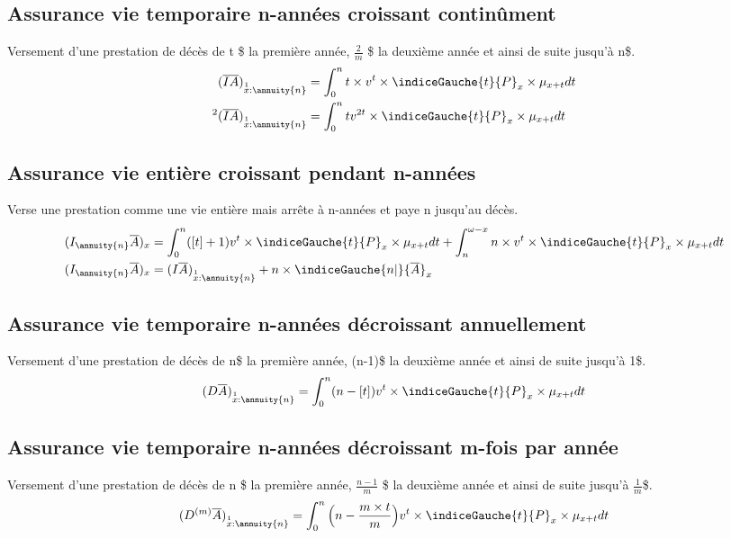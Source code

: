 \subsection{Assurance vie temporaire n-années croissant continûment}
Versement d'une prestation de décès de t \$ la première année, $\frac{2}{m}$ \$ la deuxième année et ainsi de suite jusqu'à n\$.
\begin{align*}
(\overline{IA})_{\overset{1}{x}:\annuity{n}} &= \int_{0}^{n} t\times v^t \times \indiceGauche{t}{P}_{x}\times \mu_{x+t}dt \\
{}^2(\overline{IA})_{\overset{1}{x}:\annuity{n}} &= \int_{0}^{n}t v^{2t} \times \indiceGauche{t}{P}_{x}\times \mu_{x+t}dt \\
\end{align*}

\subsection{Assurance vie  entière croissant pendant n-années}
Verse une prestation comme une vie entière mais arrête à n-années et paye n jusqu'au décès.
\begin{align*}
(I_{\annuity{n}}\overline{A})_{x} &= \int_{0}^{n}([t] +1 )v^t \times \indiceGauche{t}{P}_{x} \times\mu_{x+t}dt + \int_{n}^{\omega - x}n \times v^t \times \indiceGauche{t}{P}_{x} \times\mu_{x+t}dt \\
(I_{\annuity{n}}\overline{A})_{x} &= (I\overline{A})_{\overset{1}{x}:\annuity{n}} + n \times \indiceGauche{n|}{\overline{A}}_x\\
\end{align*}

\subsection{Assurance vie  temporaire n-années décroissant annuellement}
Versement d'une prestation de décès de n\$ la première année, (n-1)\$ la deuxième année et ainsi de suite jusqu'à 1\$.
\begin{align*}
(D\overline{A})_{\overset{1}{x}:\annuity{n}} &= \int_{0}^{n}(n - [t] )v^t \times \indiceGauche{t}{P}_{x} \times\mu_{x+t}dt \\
\end{align*}

\subsection{Assurance vie temporaire n-années décroissant m-fois par année}
Versement d'une prestation de décès de n \$ la première année, $\frac{n-1}{m}$ \$ la deuxième année et ainsi de suite jusqu'à $\frac{1}{m}$\$.
\begin{align*}
(D^{(m)}\overline{A})_{\overset{1}{x}:\annuity{n}} &= \int_{0}^{n}\Big(n - \frac{m \times t}{m}\Big)v^t \times \indiceGauche{t}{P}_{x}\times \mu_{x+t}dt \\
\end{align*}

